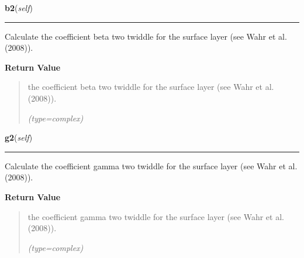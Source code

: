     \label{satstress:SatStress:StressDef:b2}

    \vspace{0.5ex}

\hspace{.8\funcindent}\begin{boxedminipage}{\funcwidth}

    \raggedright \textbf{b2}(\textit{self})

    \vspace{-1.5ex}

    \rule{\textwidth}{0.5\fboxrule}
\setlength{\parskip}{2ex}
    Calculate the coefficient beta two twiddle for the surface layer (see 
    Wahr et al. (2008)).

\setlength{\parskip}{1ex}
      \textbf{Return Value}
    \vspace{-1ex}

      \begin{quote}
      the coefficient beta two twiddle for the surface layer (see Wahr et 
      al. (2008)).

      {\it (type=complex)}

      \end{quote}

    \end{boxedminipage}

    \label{satstress:SatStress:StressDef:g2}

    \vspace{0.5ex}

\hspace{.8\funcindent}\begin{boxedminipage}{\funcwidth}

    \raggedright \textbf{g2}(\textit{self})

    \vspace{-1.5ex}

    \rule{\textwidth}{0.5\fboxrule}
\setlength{\parskip}{2ex}
    Calculate the coefficient gamma two twiddle for the surface layer (see 
    Wahr et al. (2008)).

\setlength{\parskip}{1ex}
      \textbf{Return Value}
    \vspace{-1ex}

      \begin{quote}
      the coefficient gamma two twiddle for the surface layer (see Wahr et 
      al. (2008)).

      {\it (type=complex)}

      \end{quote}

    \end{boxedminipage}

